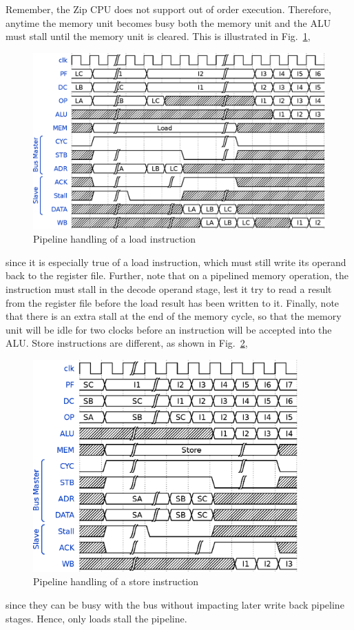 \documentclass{gqtekspec}
\begin{document}
\begin{itemize}
Remember, the Zip CPU does not support out of order execution.  Therefore,
anytime the memory unit becomes busy both the memory unit and the ALU must
stall until the memory unit is cleared.  This is illustrated in
Fig.~\ref{fig:memrd},
\begin{figure}\begin{center}
\includegraphics[width=5.6in]{../gfx/memrd.eps}
\caption{Pipeline handling of a load instruction}\label{fig:memrd}
\end{center}\end{figure}
since it is especially true of a load
instruction, which must still write its operand back to the register file.
Further, note that on a pipelined memory operation, the instruction must
stall in the decode operand stage, lest it try to read a result from the
register file before the load result has been written to it.  Finally, note
that there is an extra stall at the end of the memory cycle, so that
the memory unit will be idle for two clocks before an instruction will be
accepted into the ALU.  Store instructions are different, as shown in
Fig.~\ref{fig:memwr},
\begin{figure}\begin{center}
\includegraphics[width=4in]{../gfx/memwr.eps}
\caption{Pipeline handling of a store instruction}\label{fig:memwr}
\end{center}\end{figure}
since they can be busy with the bus without impacting later write back
pipeline stages.  Hence, only loads stall the pipeline.


\end{itemize}
\end{document}
